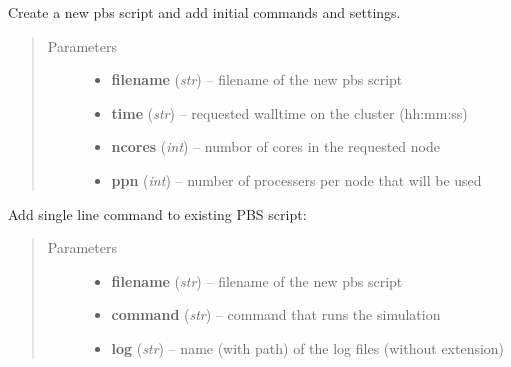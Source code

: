 \documentclass[letterpaper,10pt,english]{sphinxmanual}
\begin{document}

\begin{fulllineitems}
\label{CC3DPipeline:CC3DPipeline.createPBS}
Create a new pbs script and add initial commands and settings.
\begin{quote}\begin{description}
\item[{Parameters}] \leavevmode\begin{itemize}
\item {} 
\textbf{filename} (\emph{str}) -- filename of the new pbs script

\item {} 
\textbf{time} (\emph{str}) -- requested walltime on the cluster (hh:mm:ss)

\item {} 
\textbf{ncores} (\emph{int}) -- numbor of cores in the requested node

\item {} 
\textbf{ppn} (\emph{int}) -- number of processers per node that will be used

\end{itemize}

\end{description}\end{quote}

\end{fulllineitems}


\begin{fulllineitems}
\label{CC3DPipeline:CC3DPipeline.addCommandToPBS}
Add single line command to existing PBS script:
\begin{quote}\begin{description}
\item[{Parameters}] \leavevmode\begin{itemize}
\item {} 
\textbf{filename} (\emph{str}) -- filename of the new pbs script

\item {} 
\textbf{command} (\emph{str}) -- command that runs the simulation

\item {} 
\textbf{log} (\emph{str}) -- name (with path) of the log files (without extension)

\end{itemize}

\end{description}\end{quote}

\end{fulllineitems}
\end{document}
